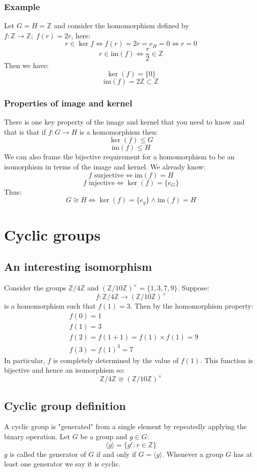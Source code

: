 \documentclass[12pt]{article}
\begin{document}
\subsubsection*{Example}
Let \(G=H=\mathbb{Z}\) and consider the homomorphism defined by \(f:\mathbb{Z}\to \mathbb{Z}; \;f(r)=2r\), here:
\[r\in \ker{f}\iff f(r)=2r=e_H=0\iff r=0\]
\[r\in \text{im}(f)\iff \frac{r}{2}\in \mathbb{Z}\]
Then we have:
\[\ker(f)=\{0\}\]
\[\text{im}(f)=2\mathbb{Z}\subset \mathbb{Z}\]
\subsubsection*{Properties of image and kernel}
There is one key property of the image and kernel that you need to know and that is that if \(f:G\to H\) is a homomorphism then:
\[\ker(f)\leqslant G\]
\[\text{im}(f)\leqslant H\]
We can also frame the bijective requirement for a homomorphism to be an isomorphism in terms of the image and kernel. We already know:
\[f\text{ surjective}\iff \text{im}(f)=H\]
\[f\text{ injective}\iff \ker(f)=\{e_G\}\]
Thus:
\[G\cong H\iff \ker(f)=\{e_g\}\land \text{im}(f)=H\]
\section{Cyclic groups}
\subsection*{An interesting isomorphism}
Consider the groups \(\mathbb{Z}/4\mathbb{Z}\) and \((\mathbb{Z}/10\mathbb{Z})^\times=\{1,3,7,9\}\). Suppose:
\[f:\mathbb{Z}/4\mathbb{Z}\to (\mathbb{Z}/10\mathbb{Z})^\times\]
is a homomorphism such that \(f(1)=3\). Then by the homomorphism property:
\begin{align*}
    &f(0)=1 \\
    &f(1)=3 \\
    &f(2)=f(1+1)=f(1)\times f(1)=9 \\
    &f(3)=f(1)^3=7
\end{align*}
In particular, \(f\) is completely determined by the value of \(f(1)\). This function is bijective and hence an isomorphism so:
\[\mathbb{Z}/4\mathbb{Z}\cong (\mathbb{Z}/10\mathbb{Z})^\times\]
\subsection*{Cyclic group definition}
A cyclic group is "generated" from a single element by repeatedly applying the binary operation. Let \(G\) be a group and \(g\in G\):
\[\langle g\rangle =\{g^r:r\in\mathbb{Z}\}\]
\(g\) is called the generator of \(G\) if and only if \(G=\langle g\rangle\). Whenever a group \(G\) has at least one generator we say it is cyclic.
\end{document}

